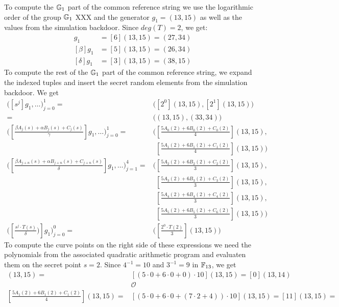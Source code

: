 \begin{example}
To compute the $\mathbb{G}_1$ part of the common reference string we use the logarithmic order of the group $\mathbb{G}_1$ XXX and the generator $g_1=(13,15)$ as well as the values from the simulation backdoor. Since $deg(T)=2$, we get:
\begin{align*}
[\alpha]g_1 & = [6](13,15) = (27,34) \\
[\beta]g_1 & = [5](13,15) = (26,34) \\
[\delta]g_1 & = [3](13,15) = (38,15)
\end{align*}
To compute the rest of the $\mathbb{G}_1$ part of the common reference string, we expand the indexed tuples and insert the secret random elements from the simulation backdoor. We get
\begin{align*}
\Big( [s^{j}]g_1,\ldots\Big) _{j=0}^{1} = 
 & \Big( [2^0](13,15), [2^1](13,15)\Big)  \\
 = & \Big((13,15),(33,34)\Big)\\
\Big([\frac{\beta A_{j}(s)+ \alpha B_{j}(s) + C_{j}(s)}{\gamma}]g_1,\ldots\Big)_{j=0}^1 =
 & \Big([\frac{5 A_{0}(2)+6 B_{0}(2)+C_{0}(2)}{4}](13,15),\\
 &\phantom{\Big(} [\frac{5 A_{1}(2)+6 B_{1}(2)+C_{1}(2)}{4}](13,15)\Big)\\
\Big([\frac{\beta A_{j+n}(s)+ \alpha B_{j+n}(s) + C_{j+n}(s)}{\delta}]g_1,\ldots\Big)_{j=1}^4 = 
&  \Big( [\frac{5 A_{2}(2)+ 6 B_{2}(2) + C_{2}(2)}{3}](13,15),\\ 
& \phantom{\Big(} [\frac{5 A_{3}(2)+ 6 B_{3}(2) + C_{3}(2)}{3}](13,15),\\
& \phantom{\Big(} [\frac{5 A_{4}(2)+ 6 B_{4}(2) + C_{4}(2)}{3}](13,15),\\ 
& \phantom{\Big(} [\frac{5 A_{5}(2)+ 6 B_{5}(2) + C_{6}(2)}{3}](13,15)\Big)\\
\Big([\frac{s^j\cdot T(s)}{\delta})]g_1\Big)_{j=0}^0 = & \Big([\frac{2^0\cdot T(2)}{3}](13,15)\Big) 
\end{align*}
To compute the curve points on the right side of these expressions we need the polynomials from the associated quadratic arithmetic program and evaluaten them on the secret point $s=2$. Since $4^{-1}=10$ and $3^{-1}=9$ in $\mathbb{F}_{13}$, we get 
\begin{align*}
[\frac{5 A_{0}(2)+6 B_{0}(2)+C_{0}(2)}{4}](13,15) = 
 & [(5 \cdot 0 +6\cdot 0 + 0)\cdot 10](13,15) = [0](13,14)\\
 & \mathcal{O} \\
[\frac{5 A_{1}(2)+6 B_{1}(2)+C_{1}(2)}{4}](13,15) = 
 & [(5\cdot 0 +6\cdot 0 + (7\cdot 2 + 4))\cdot 10](13,15) = [11](13,15) = \\

\end{align*}
\end{example}
